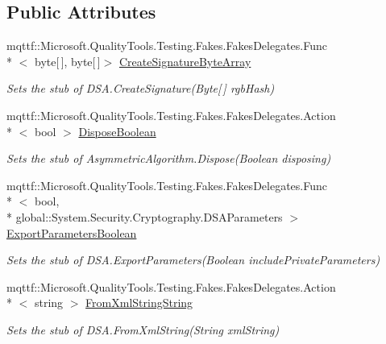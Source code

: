 \subsection*{Public Attributes}
\begin{DoxyCompactItemize}
\item 
mqttf\-::\-Microsoft.\-Quality\-Tools.\-Testing.\-Fakes.\-Fakes\-Delegates.\-Func\\*
$<$ byte\mbox{[}$\,$\mbox{]}, byte\mbox{[}$\,$\mbox{]}$>$ \hyperlink{class_system_1_1_security_1_1_cryptography_1_1_fakes_1_1_stub_d_s_a_aa1995b4670361318ab51e798054b16ac}{Create\-Signature\-Byte\-Array}
\begin{DoxyCompactList}\small\item\em Sets the stub of D\-S\-A.\-Create\-Signature(\-Byte\mbox{[}$\,$\mbox{]} rgb\-Hash)\end{DoxyCompactList}\item 
mqttf\-::\-Microsoft.\-Quality\-Tools.\-Testing.\-Fakes.\-Fakes\-Delegates.\-Action\\*
$<$ bool $>$ \hyperlink{class_system_1_1_security_1_1_cryptography_1_1_fakes_1_1_stub_d_s_a_ad70612a08f0f754bf6993fd441e7e44a}{Dispose\-Boolean}
\begin{DoxyCompactList}\small\item\em Sets the stub of Asymmetric\-Algorithm.\-Dispose(\-Boolean disposing)\end{DoxyCompactList}\item 
mqttf\-::\-Microsoft.\-Quality\-Tools.\-Testing.\-Fakes.\-Fakes\-Delegates.\-Func\\*
$<$ bool, \\*
global\-::\-System.\-Security.\-Cryptography.\-D\-S\-A\-Parameters $>$ \hyperlink{class_system_1_1_security_1_1_cryptography_1_1_fakes_1_1_stub_d_s_a_afab6a4c270991917e426323ed509e462}{Export\-Parameters\-Boolean}
\begin{DoxyCompactList}\small\item\em Sets the stub of D\-S\-A.\-Export\-Parameters(\-Boolean include\-Private\-Parameters)\end{DoxyCompactList}\item 
mqttf\-::\-Microsoft.\-Quality\-Tools.\-Testing.\-Fakes.\-Fakes\-Delegates.\-Action\\*
$<$ string $>$ \hyperlink{class_system_1_1_security_1_1_cryptography_1_1_fakes_1_1_stub_d_s_a_ac2a12acc53aa0272e3abd250ae72048d}{From\-Xml\-String\-String}
\begin{DoxyCompactList}\small\item\em Sets the stub of D\-S\-A.\-From\-Xml\-String(\-String xml\-String)\end{DoxyCompactList}\item 

\end{DoxyCompactItemize}
